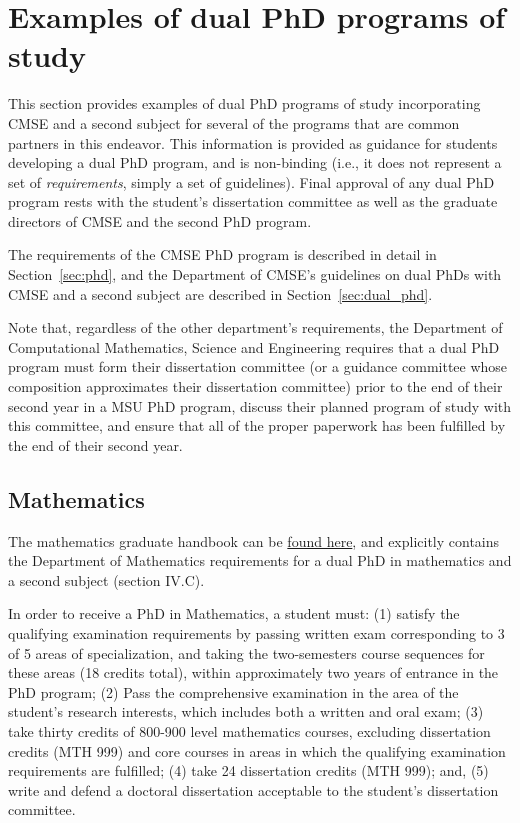 \section{Examples of dual PhD programs of study}
\label{sec:dual_phd_examples}

This section provides examples of dual PhD programs of study
incorporating CMSE and a second subject for several of the programs
that are common partners in this endeavor.  This information is
provided as guidance for students developing a dual PhD program, and
is non-binding (i.e., it does not represent a set of
\textit{requirements}, simply a set of guidelines).  Final approval of
any dual PhD program rests with the student's dissertation committee
as well as the graduate directors of CMSE and the second PhD program.

The requirements of the CMSE PhD program is described in detail in
Section~\ref{sec:phd}, and the Department of CMSE's guidelines on dual
PhDs with CMSE and a second subject are described in
Section~\ref{sec:dual_phd}.

Note that, regardless of the other department's requirements, the
Department of Computational Mathematics, Science and Engineering
requires that a dual PhD program must form their dissertation
committee (or a guidance committee whose composition approximates
their dissertation committee) prior to the end of their second year in
a MSU PhD program, discuss their planned program of study with this
committee, and ensure that all of the proper paperwork has been
fulfilled by the end of their second year.

\subsection{Mathematics}

The mathematics graduate handbook can be
\href{https://mth.msu.edu/graduate/files/handbook/Graduate_Student_Handbook_2015_And_Later.pdf}{found
  here}, and explicitly contains the Department of Mathematics
requirements for a dual PhD in mathematics and a second subject
(section IV.C).

In order to receive a PhD in Mathematics, a student must: (1) satisfy
the qualifying examination requirements by passing written exam
corresponding to 3 of 5 areas of specialization, and taking the
two-semesters course sequences for these areas (18 credits
total), within approximately two years of entrance in the PhD program;
(2) Pass the comprehensive examination in the area of the
student's research interests, which includes both a written and oral
exam; (3) take thirty credits of 800-900 level mathematics courses,
excluding dissertation credits (MTH 999) and core courses in areas in
which the qualifying examination requirements are fulfilled; (4) take
24 dissertation credits (MTH 999); and, (5) write and defend a
doctoral dissertation acceptable to the student's dissertation
committee.

